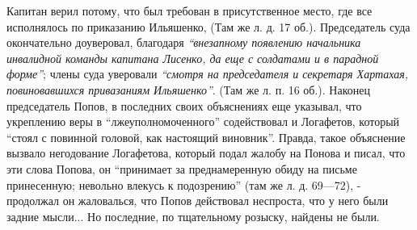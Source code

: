 \documentclass[a4paper,20pt]{report}
\begin{document}
Капитан верил потому, что был требован в присутственное место, где все исполнялось 
по приказанию Ильяшенко, (Там же л. д. 17 об.). Председатель суда окончательно доуверовал, 
благодаря
\emph{``внезапному появлению начальника инвалидной команды капитана Лисенко, 
да еще с солдатами и в парадной форме''};
члены суда уверовали \emph{``смотря на председателя и секретаря
Хартахая, повиновавшихся привазаниям Ильяшенко''}. (Там
же л. п. 16 об.). Наконец председатель Попов, в последних своих объяснениях еще
указывал, 
что укреплению веры в ``лжеуполномоченного'' содействовал и Логафетов, который ``стоял с повинной головой, как настоящий
виновник''.
Правда, такое объяснение вызвало негодование
Логафетова, который подал жалобу на Понова и писал,
что эти слова Попова, он ``принимает за преднамеренную
обиду на письме принесенную; невольно влекусь к подозрению'' (там же л. д. 69—72), - продолжал он 
жаловалься, что Попов действовал неспроста, что у него
были задние мысли... Но последние, по тщательному розыску,
найдены не были.
\end{document}
